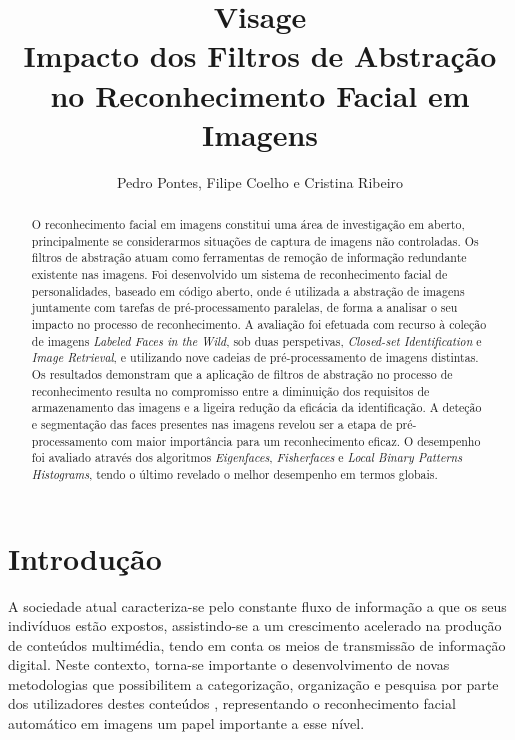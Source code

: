 \documentclass{llncs}
\begin{document}
\pagestyle{headings}  %
\title{Visage \\ Impacto dos Filtros de Abstração no Reconhecimento Facial em Imagens}

\author{Pedro Pontes, Filipe Coelho e Cristina Ribeiro}


\maketitle

\begin{abstract}
O reconhecimento facial em imagens constitui uma área de investigação em aberto, principalmente se considerarmos situações de captura de imagens não controladas. Os filtros de abstração atuam como ferramentas de remoção de informação redundante existente nas imagens. Foi desenvolvido um sistema de reconhecimento facial de personalidades, baseado em código aberto, onde é utilizada a abstração de imagens juntamente com tarefas de pré-processamento paralelas, de forma a analisar o seu impacto no processo de reconhecimento. A avaliação foi efetuada com recurso à coleção de imagens \textit{Labeled Faces in the Wild}, sob duas perspetivas, \textit{Closed-set Identification} e \textit{Image Retrieval}, e utilizando nove cadeias de pré-processamento de imagens distintas.
Os resultados demonstram que a aplicação de filtros de abstração no processo de reconhecimento resulta no compromisso entre a diminuição dos requisitos de armazenamento das imagens e a ligeira redução da eficácia da identificação. A deteção e segmentação das faces presentes nas imagens revelou ser a etapa de pré-processamento com maior importância para um reconhecimento eficaz. O desempenho foi avaliado através dos algoritmos \textit{Eigenfaces}, \textit{Fisherfaces} e \textit{Local Binary Patterns Histograms}, tendo o último revelado o melhor desempenho em termos globais.
\end{abstract}

\section{Introdução}
A sociedade atual caracteriza-se pelo constante fluxo de informação a que os seus indivíduos estão expostos, assistindo-se a um crescimento acelerado na produção de conteúdos multimédia, tendo em conta os meios de transmissão de informação digital. Neste contexto, torna-se importante o desenvolvimento de novas metodologias que possibilitem a categorização, organização e pesquisa por parte dos utilizadores destes conteúdos \cite{Datta2008}, representando o reconhecimento facial automático em imagens um papel importante a esse nível.
\end{document}
